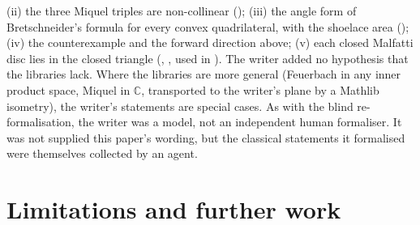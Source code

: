 \documentclass[11pt]{article}
\theoremstyle{definition}
\theoremstyle{remark}
\newcommand{\CC}{\mathbb{C}}
\begin{document}
(ii) the three Miquel triples are non-collinear ();
(iii) the angle form of Bretschneider's formula for every convex quadrilateral, with the shoelace area
();
(iv) the counterexample and the forward direction above;
(v) each closed Malfatti disc lies in the closed triangle
(, ,
used in ).
The writer added no hypothesis that the libraries lack. Where the libraries are more general (Feuerbach in
any inner product space, Miquel in $\CC$, transported to the writer's plane by a Mathlib isometry), the
writer's statements are special cases. As with the blind re-formalisation, the writer was a model, not an
independent human formaliser. It was not supplied this paper's wording, but the classical statements it
formalised were themselves collected by an agent.

\section{Limitations and further work}\label{sec:limits}
\end{document}
